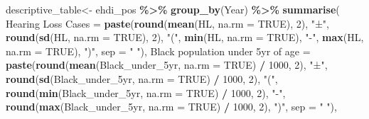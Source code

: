\documentclass[
]{article}
\newenvironment{Shaded}{\begin{snugshade}}{\end{snugshade}}
\newcommand{\AttributeTok}[1]{\textcolor[rgb]{0.13,0.29,0.53}{#1}}
\newcommand{\ConstantTok}[1]{\textcolor[rgb]{0.56,0.35,0.01}{#1}}
\newcommand{\DecValTok}[1]{\textcolor[rgb]{0.00,0.00,0.81}{#1}}
\newcommand{\FunctionTok}[1]{\textcolor[rgb]{0.13,0.29,0.53}{\textbf{#1}}}
\newcommand{\NormalTok}[1]{#1}
\newcommand{\OtherTok}[1]{\textcolor[rgb]{0.56,0.35,0.01}{#1}}
\newcommand{\SpecialCharTok}[1]{\textcolor[rgb]{0.81,0.36,0.00}{\textbf{#1}}}
\newcommand{\StringTok}[1]{\textcolor[rgb]{0.31,0.60,0.02}{#1}}
\begin{document}
\begin{Shaded}
\begin{Highlighting}[]
\NormalTok{descriptive\_table}\OtherTok{\textless{}{-}}\NormalTok{ ehdi\_pos }\SpecialCharTok{\%\textgreater{}\%}
  \FunctionTok{group\_by}\NormalTok{(Year) }\SpecialCharTok{\%\textgreater{}\%}
  \FunctionTok{summarise}\NormalTok{(}
    \StringTok{\textasciigrave{}}\AttributeTok{Hearing Loss Cases}\StringTok{\textasciigrave{}} \OtherTok{=} \FunctionTok{paste}\NormalTok{(}\FunctionTok{round}\NormalTok{(}\FunctionTok{mean}\NormalTok{(HL, }\AttributeTok{na.rm =} \ConstantTok{TRUE}\NormalTok{), }\DecValTok{2}\NormalTok{), }\StringTok{"±"}\NormalTok{, }\FunctionTok{round}\NormalTok{(}\FunctionTok{sd}\NormalTok{(HL, }\AttributeTok{na.rm =} \ConstantTok{TRUE}\NormalTok{), }\DecValTok{2}\NormalTok{), }\StringTok{"("}\NormalTok{, }\FunctionTok{min}\NormalTok{(HL, }\AttributeTok{na.rm =} \ConstantTok{TRUE}\NormalTok{), }\StringTok{"{-}"}\NormalTok{, }\FunctionTok{max}\NormalTok{(HL, }\AttributeTok{na.rm =} \ConstantTok{TRUE}\NormalTok{), }\StringTok{")"}\NormalTok{, }\AttributeTok{sep =} \StringTok{" "}\NormalTok{),}
    \StringTok{\textasciigrave{}}\AttributeTok{Black population under 5yr of age}\StringTok{\textasciigrave{}} \OtherTok{=} \FunctionTok{paste}\NormalTok{(}\FunctionTok{round}\NormalTok{(}\FunctionTok{mean}\NormalTok{(Black\_under\_5yr, }\AttributeTok{na.rm =} \ConstantTok{TRUE}\NormalTok{) }\SpecialCharTok{/} \DecValTok{1000}\NormalTok{, }\DecValTok{2}\NormalTok{), }\StringTok{"±"}\NormalTok{, }\FunctionTok{round}\NormalTok{(}\FunctionTok{sd}\NormalTok{(Black\_under\_5yr, }\AttributeTok{na.rm =} \ConstantTok{TRUE}\NormalTok{) }\SpecialCharTok{/} \DecValTok{1000}\NormalTok{, }\DecValTok{2}\NormalTok{), }\StringTok{"("}\NormalTok{, }\FunctionTok{round}\NormalTok{(}\FunctionTok{min}\NormalTok{(Black\_under\_5yr, }\AttributeTok{na.rm =} \ConstantTok{TRUE}\NormalTok{) }\SpecialCharTok{/} \DecValTok{1000}\NormalTok{, }\DecValTok{2}\NormalTok{), }\StringTok{"{-}"}\NormalTok{, }\FunctionTok{round}\NormalTok{(}\FunctionTok{max}\NormalTok{(Black\_under\_5yr, }\AttributeTok{na.rm =} \ConstantTok{TRUE}\NormalTok{) }\SpecialCharTok{/} \DecValTok{1000}\NormalTok{, }\DecValTok{2}\NormalTok{), }\StringTok{")"}\NormalTok{, }\AttributeTok{sep =} \StringTok{" "}\NormalTok{),}

\end{Highlighting}
\end{Shaded}
\end{document}
